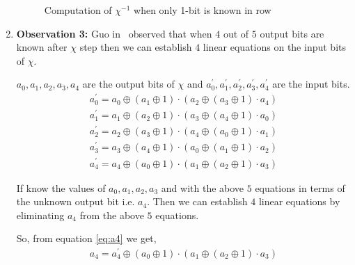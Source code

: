 \begin{enumerate}
\begin{figure}[ht]
\begin{center}
\end{center}
\caption{Computation of $\chi^{-1}$ when only 1-bit is known in row \label{chi_inv2}}
\end{figure}

\item \label{ob3}\textbf{Observation 3:} Guo \etal in~\cite{guo2016linear} observed that when $4$ out of $5$ output bits are known after $\chi$ step then we can establish $4$ linear equations on the input bits of $\chi$.

$a_0, a_1, a_2, a_3, a_4$ are the output bits of $\chi$ and $a_0^\prime, a_1^\prime, a_2^\prime, a_3^\prime, a_4^\prime$ are the input bits.
\begin{align}\label{eq:a0}
a_0^\prime = a_0 \oplus \left( a_{1} \oplus 1\right) \cdot \left( a_{2} \oplus \left( a_{3} \oplus 1 \right) \cdot a_{4}\right)
\end{align}
\begin{align}\label{eq:a1}
a_1^\prime = a_1 \oplus \left( a_{2} \oplus 1\right) \cdot \left( a_{3} \oplus \left( a_{4} \oplus 1 \right) \cdot a_{0}\right)
\end{align}
\begin{align}\label{eq:a2}
a_2^\prime = a_2 \oplus \left( a_{3} \oplus 1\right) \cdot \left( a_{4} \oplus \left( a_{0} \oplus 1 \right) \cdot a_{1}\right)
\end{align}
\begin{align}\label{eq:a3}
a_3^\prime = a_3 \oplus \left( a_{4} \oplus 1\right) \cdot \left( a_{0} \oplus \left( a_{1} \oplus 1 \right) \cdot a_{2}\right)
\end{align}
\begin{align}\label{eq:a4}
a_4^\prime = a_4 \oplus \left( a_{0} \oplus 1\right) \cdot \left( a_{1} \oplus \left( a_{2} \oplus 1 \right) \cdot a_{3}\right)
\end{align}

If know the values of $a_0, a_1, a_2, a_3$ and with the above $5$ equations in terms of the unknown output bit i.e. $a_4$. Then we can establish $4$ linear equations by eliminating $a_4$ from the above $5$ equations.

So, from equation \ref{eq:a4} we get,
\begin{align}\label{eq:a4_2}
 a_4 = a_4^\prime \oplus \left( a_{0} \oplus 1\right) \cdot \left( a_{1} \oplus \left( a_{2} \oplus 1 \right) \cdot a_{3}\right)
\end{align}


\end{enumerate}
